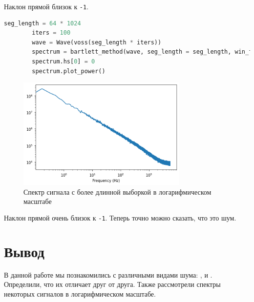 \documentclass[a4paper, 12pt]{report}
\begin{document}
	Наклон прямой близок к \texttt{-1}.
	\begin{lstlisting}[language=Python,caption=Более длинная выборка]
		seg_length = 64 * 1024
		iters = 100
		wave = Wave(voss(seg_length * iters))
		spectrum = bartlett_method(wave, seg_length = seg_length, win_flag = False)
		spectrum.hs[0] = 0
		spectrum.plot_power()
	\end{lstlisting}
	\begin{figure}[H]
		\centering
		\includegraphics[width=0.75\textwidth]{test9.png}
		\caption{Спектр сигнала с более длинной выборкой в логарифмическом масштабе}
		\label{fig:test9}
	\end{figure}
	Наклон прямой очень близок к \texttt{-1}. Теперь точно можно сказать, что это  шум.

	\chapter{Вывод}
	В данной работе мы познакомились с различными видами шума: ,  и . Определили, что их отличает друг от друга. Также рассмотрели спектры некоторых сигналов в логарифмическом масштабе.
\end{document}
